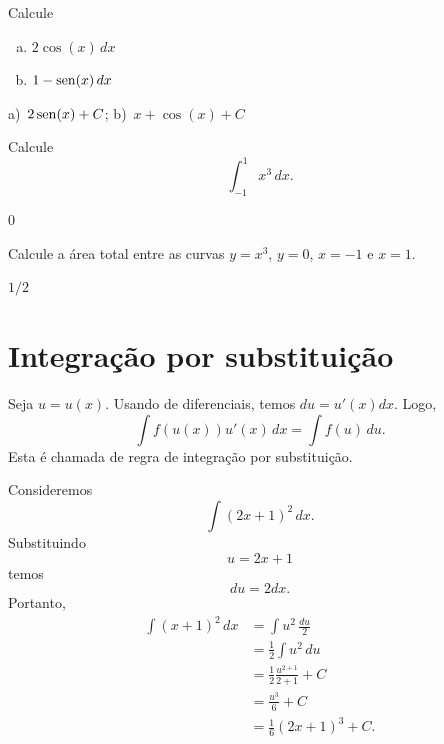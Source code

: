 \begin{exer}
  Calcule
  \begin{enumerate}[a)]
  \item $\displaystyle 2\cos(x)\,dx$
  \item $\displaystyle 1 - \operatorname{sen}(x)\,dx$
  \end{enumerate}
\end{exer}
\begin{resp}
  a)~$\displaystyle 2\operatorname{sen}(x) + C$; b)~$\displaystyle x + \cos(x) + C$
\end{resp}

\begin{exer}
  Calcule
  \begin{equation}
    \int_{-1}^1 x^3\,dx.
  \end{equation}
\end{exer}
\begin{resp}
  $0$
\end{resp}

\begin{exer}
  Calcule a área total entre as curvas $y=x^3$, $y=0$, $x=-1$ e $x=1$.
\end{exer}
\begin{resp}
  $1/2$
\end{resp}


\section{Integração por substituição}\label{cap_int_sec_subs}

Seja $u = u(x)$. Usando de diferenciais, temos $du = u'(x)dx$. Logo,
\begin{equation}
  \int f(u(x))u'(x)\,dx = \int f(u)\,du.
\end{equation}
Esta é chamada de regra de integração por substituição.

\begin{ex}
  Consideremos
  \begin{equation}
    \int (2x+1)^2\,dx.
  \end{equation}
  Substituindo
  \begin{equation}
    u = 2x+1
  \end{equation}
  temos
  \begin{equation}
    du = 2dx.
  \end{equation}
  Portanto,
  \begin{align}
    \int (x+1)^2\,dx &= \int u^2\,\frac{du}{2}\\
                     &= \frac{1}{2}\int u^2\,du\\
                     &= \frac{1}{2}\frac{u^{2+1}}{2+1} + C\\
                     &= \frac{u^3}{6} + C\\
                     &= \frac{1}{6}(2x+1)^3 + C.
  \end{align}
\end{ex}

